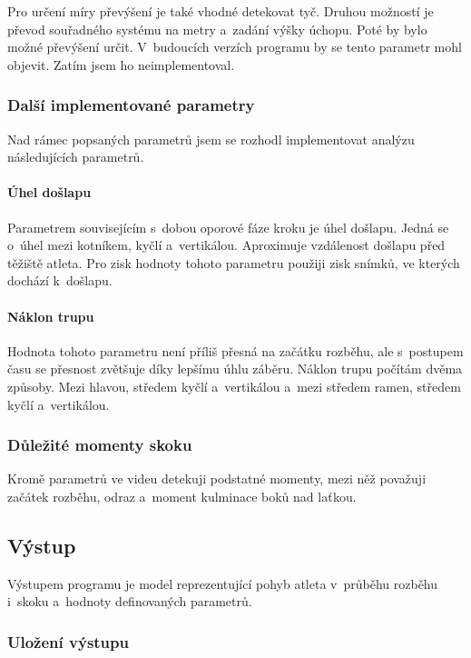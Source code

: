 Pro určení míry převýšení je také vhodné detekovat tyč. Druhou možností je převod souřadného systému na metry a~zadání výšky úchopu. Poté by bylo možné převýšení určit. V~budoucích verzích programu by se tento parametr mohl objevit. Zatím jsem ho neimplementoval.

\subsubsection{Další implementované parametry}

Nad rámec popsaných parametrů jsem se rozhodl implementovat analýzu následujících parametrů.

\paragraph{Úhel došlapu}

Parametrem souvisejícím s~dobou oporové fáze kroku je úhel došlapu. Jedná se o~úhel mezi kotníkem, kyčlí a~vertikálou. Aproximuje vzdálenost došlapu před těžiště atleta. Pro zisk hodnoty tohoto parametru použiji zisk snímků, ve kterých dochází k~došlapu.

\paragraph{Náklon trupu}

Hodnota tohoto parametru není příliš přesná na začátku rozběhu, ale s~postupem času se přesnost zvětšuje díky lepšímu úhlu záběru. Náklon trupu počítám dvěma způsoby. Mezi hlavou, středem kyčlí a~vertikálou a~mezi středem ramen, středem kyčlí a~vertikálou.

\subsubsection{Důležité momenty skoku}

Kromě parametrů ve videu detekuji podstatné momenty, mezi něž považuji začátek rozběhu, odraz a~moment kulminace boků nad laťkou.

\subsection{Výstup}

Výstupem programu je model reprezentující pohyb atleta v~průběhu rozběhu i~skoku a~hodnoty definovaných parametrů.

\subsubsection{Uložení výstupu}

